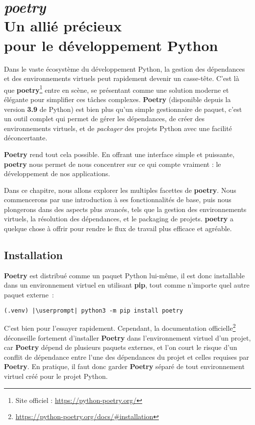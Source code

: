 \chapter[\textit{poetry}]{\textit{poetry} \\ Un allié précieux \\ pour le développement Python}

\bigskip

Dans le vaste écosystème du développement Python, la gestion des dépendances et des environnements virtuels peut rapidement devenir un casse-tête. C'est là que \textbf{poetry}\footnote{Site officiel : \url{https://python-poetry.org/}} entre en scène, se présentant comme une solution moderne et élégante pour simplifier ces tâches complexes. \textbf{Poetry} (disponible depuis la version \textbf{3.9} de Python) est bien plus qu'un simple gestionnaire de paquet, c'est un outil complet qui permet de gérer les dépendances, de créer des environnements virtuels, et de \textit{packager} des projets Python avec une facilité déconcertante.

\textbf{Poetry} rend tout cela possible. En offrant une interface simple et puissante, \textbf{poetry} nous permet de nous concentrer sur ce qui compte vraiment : le développement de nos applications.

Dans ce chapitre, nous allons explorer les multiples facettes de \textbf{poetry}. Nous commencerons par une introduction à ses fonctionnalités de base, puis nous plongerons dans des aspects plus avancés, tels que la gestion des environnements virtuels, la résolution des dépendances, et le packaging de projets. \textbf{poetry} a quelque chose à offrir pour rendre le flux de travail plus efficace et agréable.

\section{Installation}
\textbf{Poetry} est distribué comme un paquet Python lui-même, il est donc installable dans un environnement virtuel en utilisant \textbf{pip}, tout comme n’importe quel autre paquet externe :
\begin{lstlisting}[style=bash]
(.venv) |\userprompt| python3 -m pip install poetry
\end{lstlisting}

C’est bien pour l’essayer rapidement. Cependant, la documentation officielle\footnote{\url{https://python-poetry.org/docs/\#installation}} déconseille fortement d’installer \textbf{Poetry} dans l'environnement virtuel d'un projet, car \textbf{Poetry} dépend de plusieurs paquets externes, et l'on court le risque d’un conflit de dépendance entre l’une des dépendances du projet et celles requises par \textbf{Poetry}. En pratique, il faut donc garder \textbf{Poetry} séparé de tout environnement virtuel créé pour le projet Python. 


